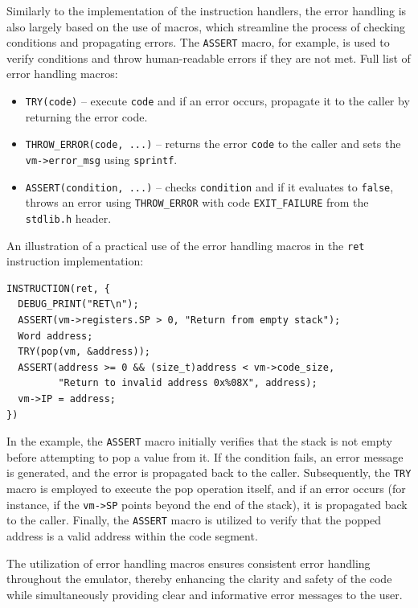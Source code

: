 \documentclass[12pt,a4paper,final]{article}
\newcommand{\code}[1]{\texttt{#1}}
\begin{document}
Similarly to the implementation of the instruction handlers, the error handling
is also largely based on the use of macros, which streamline the process of
checking conditions and propagating errors. The \code{ASSERT} macro, for
example, is used to verify conditions and throw human-readable errors if they
are not met. Full list of error handling macros:

\begin{itemize}
\item \code{TRY(code)} -- execute \code{code} and if an error occurs, propagate
    it to the caller by returning the error code.
\item \code{THROW_ERROR(code, ...)} -- returns the error \code{code} to the
    caller and sets the \code{vm->error_msg} using \code{sprintf}.
\item \code{ASSERT(condition, ...)} -- checks \code{condition} and if it
    evaluates to \code{false}, throws an error using \code{THROW_ERROR} with
    code \code{EXIT_FAILURE} from the \code{stdlib.h} header.
\end{itemize}

An illustration of a practical use of the error handling macros in the
\code{ret} instruction implementation:

\begin{verbatim}
INSTRUCTION(ret, {
  DEBUG_PRINT("RET\n");
  ASSERT(vm->registers.SP > 0, "Return from empty stack");
  Word address;
  TRY(pop(vm, &address));
  ASSERT(address >= 0 && (size_t)address < vm->code_size,
         "Return to invalid address 0x%08X", address);
  vm->IP = address;
})
\end{verbatim}

In the example, the \code{ASSERT} macro initially verifies that the stack is not
empty before attempting to pop a value from it. If the condition fails, an error
message is generated, and the error is propagated back to the caller.
Subsequently, the \code{TRY} macro is employed to execute the pop operation
itself, and if an error occurs (for instance, if the \code{vm->SP} points beyond
the end of the stack), it is propagated back to the caller. Finally, the
\code{ASSERT} macro is utilized to verify that the popped address is a valid
address within the code segment.

The utilization of error handling macros ensures consistent error handling
throughout the emulator, thereby enhancing the clarity and safety of the code
while simultaneously providing clear and informative error messages to the user.
\end{document}
